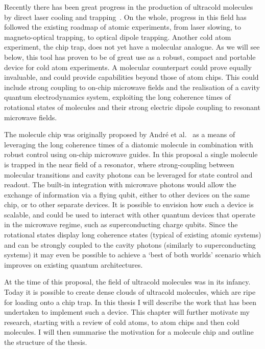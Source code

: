 
Recently there has been great progress in the production of ultracold molecules
by direct laser cooling and trapping~\cite{Fitch2021}. On the whole, progress
in this field has followed the existing roadmap of atomic experiments, from
laser slowing, to magneto-optical trapping, to optical dipole trapping.
Another cold atom experiment, the chip trap, does not yet have a molecular
analogue. As we will see below, this tool has proven to be of great use as a
robust, compact and portable device for cold atom experiments. A molecular
counterpart could prove equally invaluable, and could provide capabilities
beyond those of atom chips. This could include strong coupling to on-chip
microwave fields and  the realisation of a cavity quantum electrodynamics
system, exploiting the long coherence times of rotational states of molecules
and their strong electric dipole coupling to resonant microwave fields.

The molecule chip was originally proposed by Andr\'e et al.~\cite{Andre2006} as
a means of leveraging the long coherence times of a diatomic molecule in
combination with robust control using on-chip microwave guides. In this
proposal a single molecule is trapped in the near field of a resonator, where
strong-coupling between molecular transitions and cavity photons can be
leveraged for state control and readout. The built-in integration with
microwave photons would allow the exchange of information via a flying qubit,
either to other devices on the same chip, or to other separate devices.
%
It is possible to envision how such a device is scalable, and could be used to 
interact with other quantum devices that operate in the microwave regime, such
as superconducting charge qubits. Since the rotational states display long
coherence states (typical of existing atomic systems) and can be strongly
coupled to the cavity photons (similarly to superconducting systems) it may
even be possible to achieve a `best of both worlds' scenario which improves on
existing quantum architectures.

At the time of this proposal, the field of ultracold molecules was in its
infancy. Today it is possible to create dense clouds of ultracold molecules,
which are ripe for loading onto a chip trap. In this thesis I will describe the
work that has been undertaken to implement such a device. This chapter will
further motivate my research, starting with a review of cold atoms, to atom
chips and then cold molecules. I will then summarise the motivation for a
molecule chip and outline the structure of the thesis.

